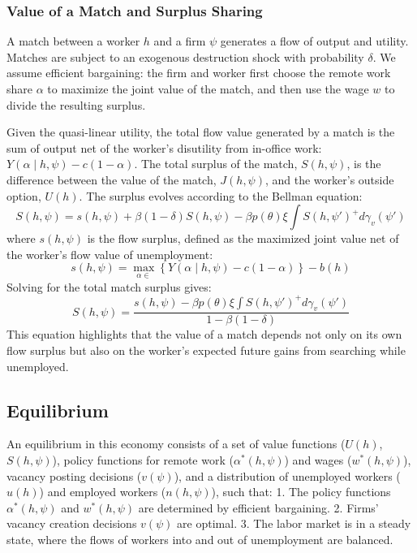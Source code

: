 \documentclass[
  11pt,
  letterpaper,
  DIV=11,
  numbers=noendperiod]{scrartcl}
\begin{document}
\subsubsection{Value of a Match and Surplus
Sharing}\label{value-of-a-match-and-surplus-sharing}

A match between a worker \(h\) and a firm \(\psi\) generates a flow of
output and utility. Matches are subject to an exogenous destruction
shock with probability \(\delta\). We assume efficient bargaining: the
firm and worker first choose the remote work share \(\alpha\) to
maximize the joint value of the match, and then use the wage \(w\) to
divide the resulting surplus.

Given the quasi-linear utility, the total flow value generated by a
match is the sum of output net of the worker's disutility from in-office
work: \(Y(\alpha \mid h, \psi) - c(1-\alpha)\). The total surplus of the
match, \(S(h, \psi)\), is the difference between the value of the match,
\(J(h, \psi)\), and the worker's outside option, \(U(h)\). The surplus
evolves according to the Bellman equation:
\[S(h, \psi) = s(h, \psi) + \beta(1-\delta)S(h, \psi) - \beta p(\theta) \xi \int S(h, \psi')^+ d\gamma_v(\psi')\]
where \(s(h, \psi)\) is the flow surplus, defined as the maximized joint
value net of the worker's flow value of unemployment:
\[s(h, \psi) = \max_{\alpha \in} \left\{ Y(\alpha \mid h, \psi) - c(1-\alpha) \right\} - b(h)\]
Solving for the total match surplus gives:
\[S(h, \psi) = \frac{s(h, \psi) - \beta p(\theta) \xi \int S(h, \psi')^+ d\gamma_v(\psi')}{1 - \beta(1-\delta)}\]
This equation highlights that the value of a match depends not only on
its own flow surplus but also on the worker's expected future gains from
searching while unemployed.

\subsection{Equilibrium}\label{equilibrium}

An equilibrium in this economy consists of a set of value functions
(\(U(h)\), \(S(h, \psi)\)), policy functions for remote work
(\(\alpha^*(h, \psi)\)) and wages (\(w^*(h, \psi)\)), vacancy posting
decisions (\(v(\psi)\)), and a distribution of unemployed workers
(\(u(h)\)) and employed workers (\(n(h, \psi)\)), such that: 1. The
policy functions \(\alpha^*(h, \psi)\) and \(w^*(h, \psi)\) are
determined by efficient bargaining. 2. Firms' vacancy creation decisions
\(v(\psi)\) are optimal. 3. The labor market is in a steady state, where
the flows of workers into and out of unemployment are balanced.
\end{document}
